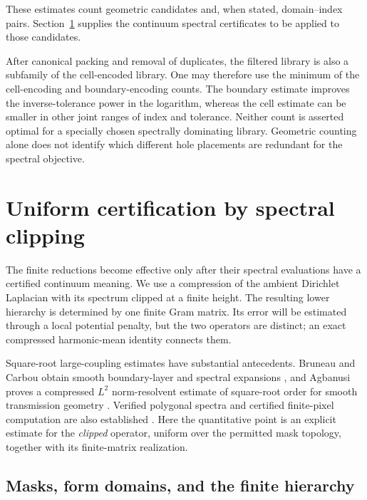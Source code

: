 \documentclass[11pt,reqno]{amsart}
\numberwithin{equation}{section}
\begin{document}
These estimates count geometric candidates and, when stated,
domain--index pairs.  Section~\ref{sec:certification} supplies the
continuum spectral certificates to be applied to those candidates.

After canonical packing and removal of duplicates, the filtered
library is also a subfamily of the cell-encoded library.  One may
therefore use the minimum of the cell-encoding and boundary-encoding
counts.  The boundary estimate improves the inverse-tolerance power
in the logarithm, whereas the cell estimate can be smaller in other
joint ranges of index and tolerance.  Neither count is asserted
optimal for a specially chosen spectrally dominating library.
Geometric counting alone does not identify which different hole
placements are redundant for the spectral objective.



\section{Uniform certification by spectral clipping}
\label{sec:certification}

The finite reductions become effective only after their spectral
evaluations have a certified continuum meaning.  We use a compression
of the ambient Dirichlet Laplacian with its spectrum clipped at a
finite height.  The resulting lower hierarchy is determined by one
finite Gram matrix.  Its error will be estimated through a local
potential penalty, but the two operators are distinct; an exact
compressed harmonic-mean identity connects them.

Square-root large-coupling estimates have substantial antecedents.
Bruneau and Carbou obtain smooth boundary-layer and spectral expansions
\cite{BruneauCarbou2002}, and Agbanusi proves a compressed
$L^2$ norm-resolvent estimate of square-root order for smooth
transmission geometry \cite[Theorem~3.1]{Agbanusi2015}.
Verified polygonal spectra and certified finite-pixel computation
are also established \cite{LiuOishi2013,RoslerStepanenko2024}.
Here the quantitative point is an explicit estimate for the
\emph{clipped} operator, uniform over the permitted mask topology,
together with its finite-matrix realization.

\subsection{Masks, form domains, and the finite hierarchy}
\label{cert:geometry}
\end{document}
